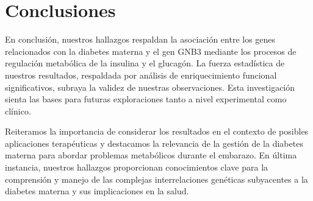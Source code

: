 \section{Conclusiones}

En conclusión, nuestros hallazgos respaldan la asociación entre los genes relacionados con la diabetes materna y el gen GNB3 mediante los procesos de regulación metabólica de la insulina y el glucagón. La fuerza estadística de nuestros resultados, respaldada por análisis de enriquecimiento funcional significativos, subraya la validez de nuestras observaciones. Esta investigación sienta las bases para futuras exploraciones tanto a nivel experimental como clínico.

Reiteramos la importancia de considerar los resultados en el contexto de posibles aplicaciones terapéuticas y destacamos la relevancia de la gestión de la diabetes materna para abordar problemas metabólicos durante el embarazo. En última instancia, nuestros hallazgos proporcionan conocimientos clave para la comprensión y manejo de las complejas interrelaciones genéticas subyacentes a la diabetes materna y sus implicaciones en la salud.

